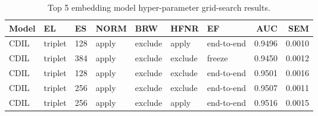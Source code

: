 \documentclass[preprint,12pt]{elsarticle}
\begin{document}
\begin{table}[!htb]
    \footnotesize	
    \begin{subtable}{\linewidth}
      \centering
        \begin{tabular}{lllllllrr}
            \toprule
            \textbf{Model} & \textbf{EL} & \textbf{ES} & \textbf{NORM} & \textbf{BRW} & \textbf{HFNR} & \textbf{EF} & \textbf{AUC} & \textbf{SEM} \\
            \midrule
            CDIL &  triplet &            128 &      apply &                   exclude &                   apply &             end-to-end &  0.9496 &  0.0010 \\
            CDIL &  triplet &            384 &      apply &                   exclude &                  exclude &              freeze &  0.9450 &  0.0012 \\
            CDIL &  triplet &            128 &      apply &                   exclude &                  exclude &             end-to-end &  0.9501 &  0.0016 \\
            CDIL &  triplet &            256 &      apply &                   exclude &                  exclude &             end-to-end &  0.9507 &  0.0011 \\
            CDIL &  triplet &            256 &      apply &                   exclude &                   apply &             end-to-end &  0.9516 &  0.0015 \\
            \bottomrule
        \end{tabular}
        \caption{Top 5 embedding model hyper-parameter grid-search results. }
        \label{tab:gridsearch-1}
    \end{subtable}

    \bigskip
    

\end{table}
\end{document}

